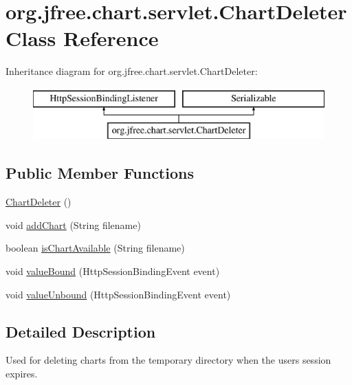 \hypertarget{classorg_1_1jfree_1_1chart_1_1servlet_1_1_chart_deleter}{}\section{org.\+jfree.\+chart.\+servlet.\+Chart\+Deleter Class Reference}
\label{classorg_1_1jfree_1_1chart_1_1servlet_1_1_chart_deleter}
Inheritance diagram for org.\+jfree.\+chart.\+servlet.\+Chart\+Deleter\+:\begin{figure}[H]
\begin{center}
\leavevmode
\includegraphics[height=2.000000cm]{classorg_1_1jfree_1_1chart_1_1servlet_1_1_chart_deleter}
\end{center}
\end{figure}
\subsection*{Public Member Functions}
\begin{DoxyCompactItemize}
\item 
\mbox{\hyperlink{classorg_1_1jfree_1_1chart_1_1servlet_1_1_chart_deleter_a2d659f520dd35e8715697faf3c2bc5f3}{Chart\+Deleter}} ()
\item 
void \mbox{\hyperlink{classorg_1_1jfree_1_1chart_1_1servlet_1_1_chart_deleter_ae1f984d94f1f8fbe6f847919e18bf58d}{add\+Chart}} (String filename)
\item 
boolean \mbox{\hyperlink{classorg_1_1jfree_1_1chart_1_1servlet_1_1_chart_deleter_a0e3f2e5f99e127fe2b09e3c37f017f76}{is\+Chart\+Available}} (String filename)
\item 
void \mbox{\hyperlink{classorg_1_1jfree_1_1chart_1_1servlet_1_1_chart_deleter_a7a48fb7bfcc51b401c0b660ca0c21bfa}{value\+Bound}} (Http\+Session\+Binding\+Event event)
\item 
void \mbox{\hyperlink{classorg_1_1jfree_1_1chart_1_1servlet_1_1_chart_deleter_ad8f8ac98ec6fc581b023fb7235ea2d4a}{value\+Unbound}} (Http\+Session\+Binding\+Event event)
\end{DoxyCompactItemize}


\subsection{Detailed Description}
Used for deleting charts from the temporary directory when the users session expires. 

